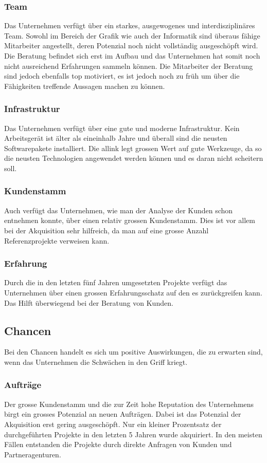 \subsubsection{Team}
Das Unternehmen verfügt über ein starkes, ausgewogenes und interdisziplinäres Team. 
Sowohl im Bereich der Grafik wie auch der Informatik sind überaus fähige Mitarbeiter 
angestellt, deren Potenzial noch nicht vollständig ausgeschöpft wird. Die Beratung
befindet sich erst im Aufbau und das Unternehmen hat somit noch nicht ausreichend
Erfahrungen sammeln können. Die Mitarbeiter der Beratung sind jedoch ebenfalls
top motiviert, es ist jedoch noch zu früh um über die Fähigkeiten treffende
Aussagen machen zu können.

\subsubsection{Infrastruktur}
Das Unternehmen verfügt über eine gute und moderne Infrastruktur. Kein Arbeitsgerät
ist älter als eineinhalb Jahre und überall sind die neusten Softwarepakete installiert.
Die allink legt grossen Wert auf gute Werkzeuge, da so die neusten Technologien
angewendet werden können und es daran nicht scheitern soll.

\subsubsection{Kundenstamm}
Auch verfügt das Unternehmen, wie man der Analyse der Kunden schon entnehmen
konnte, über einen relativ grossen Kundenstamm. Dies ist vor allem bei der
Akquisition sehr hilfreich, da man auf eine grosse Anzahl Referenzprojekte 
verweisen kann. 

\subsubsection{Erfahrung}
Durch die in den letzten fünf Jahren umgesetzten Projekte verfügt das Unternehmen
über einen grossen Erfahrungsschatz auf den es zurückgreifen kann. Das Hilft
überwiegend bei der Beratung von Kunden.

\subsection{Chancen}
Bei den Chancen handelt es sich um positive Auswirkungen, die zu erwarten sind,
wenn das Unternehmen die Schwächen in den Griff kriegt.

\subsubsection{Aufträge}
Der grosse Kundenstamm und die zur Zeit hohe Reputation des Unternehmens
birgt ein grosses Potenzial an neuen Aufträgen. Dabei ist das Potenzial der
Akquisition erst gering ausgeschöpft. Nur ein kleiner Prozentsatz der durchgeführten
Projekte in den letzten 5 Jahren wurde akquiriert. In den meisten Fällen entstanden
die Projekte durch direkte Anfragen von Kunden und Partneragenturen.

